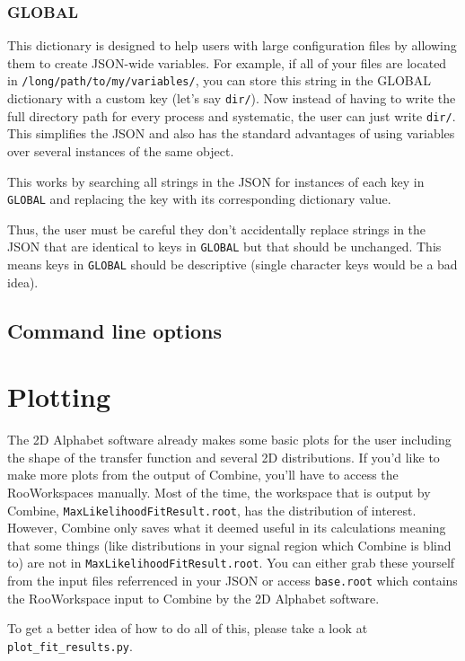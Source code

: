\documentclass[letter]{article}
\begin{document}
        \subsubsection{GLOBAL}
        	This dictionary is designed to help users with large configuration files by allowing them to create JSON-wide variables. For example, if all of your files are located in \verb"/long/path/to/my/variables/", you can store this string in the GLOBAL dictionary with a custom key (let's say \verb"dir/"). Now instead of having to write the full directory path for every process and systematic, the user can just write \verb"dir/". This simplifies the JSON and also has the standard advantages of using variables over several instances of the same object.

        	This works by searching all strings in the JSON for instances of each key in \verb"GLOBAL" and replacing the key with its corresponding dictionary value.

        	Thus, the user must be careful they don't accidentally replace strings in the JSON that are identical to keys in \verb"GLOBAL" but that should be unchanged. This means keys in \verb"GLOBAL" should be descriptive (single character keys would be a bad idea). 



    \subsection{Command line options}

\section{Plotting}
The 2D Alphabet software already makes some basic plots for the user including the shape of the transfer function and several 2D distributions. If you'd like to make more plots from the output of Combine, you'll have to access the RooWorkspaces manually. Most of the time, the workspace that is output by Combine, \verb"MaxLikelihoodFitResult.root", has the distribution of interest. However, Combine only saves what it deemed useful in its calculations meaning that some things (like distributions in your signal region which Combine is blind to) are not in \verb"MaxLikelihoodFitResult.root". You can either grab these yourself from the input files referrenced in your JSON or access \verb"base.root" which contains the RooWorkspace input to Combine by the 2D Alphabet software.

To get a better idea of how to do all of this, please take a look at \verb"plot_fit_results.py".
\end{document}
